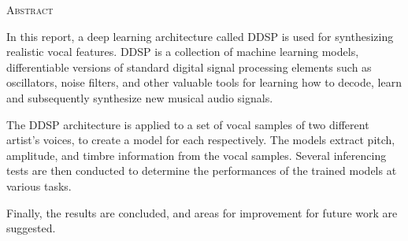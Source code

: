 \begin{center}
  \textsc{Abstract}
\end{center}

\noindent

In this report, a deep learning architecture called DDSP is used for synthesizing realistic vocal features. DDSP is a collection of machine learning models, differentiable versions of standard digital signal processing elements such as oscillators, noise filters, and other valuable tools for learning how to decode, learn and subsequently synthesize new musical audio signals.

The DDSP architecture is applied to a set of vocal samples of two different artist's voices, to create a model for each respectively. The models extract pitch, amplitude, and timbre information from the vocal samples. Several inferencing tests are then conducted to determine the performances of the trained models at various tasks.

Finally, the results are concluded, and areas for improvement for future work are suggested.